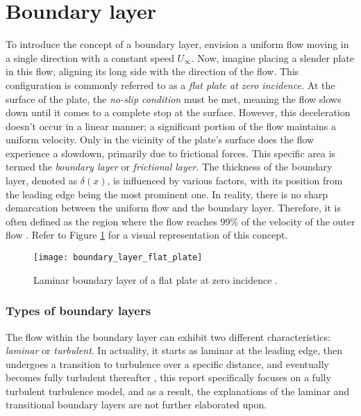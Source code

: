 \section{Boundary layer}
To introduce the concept of a boundary layer, envision a uniform flow moving in
a single direction with a constant speed $U_{\infty}$. Now, imagine placing a
slender plate in this flow, aligning its long side with the direction of the
flow. This configuration is commonly referred to as a \textit{flat plate at
zero incidence.} At the surface of the plate, the \textit{no-slip condition}
must be met, meaning the flow slows down until it comes to a complete stop at
the surface. However, this deceleration doesn't occur in a linear manner; a
significant portion of the flow maintains a uniform velocity. Only in the
vicinity of the plate's surface does the flow experience a slowdown, primarily
due to frictional forces. This specific area is termed the \textit{boundary
layer} or \textit{frictional layer.} The thickness of the boundary layer,
denoted as $\delta(x)$, is influenced by various factors, with its position
from the leading edge being the most prominent one. In reality, there is no
sharp demarcation between the uniform flow and the boundary layer. Therefore,
it is often defined as the region where the flow reaches 99\% of the velocity
of the outer flow \cite{Schlichting2018}. Refer to Figure
\ref{fig:boundary_layer_flat_plate} for a visual representation of this
concept.

\begin{figure}[H] \centering
\texttt{[image: boundary\_layer\_flat\_plate]}
    \caption{Laminar boundary layer of a flat plate at zero incidence
    \cite{Schlichting2018}.}
    \label{fig:boundary_layer_flat_plate}
\end{figure}

\subsubsection{Types of boundary layers}
The flow within the boundary layer can exhibit two different characteristics:
\textit{laminar} or \textit{turbulent}. In actuality, it starts as laminar at
the leading edge, then undergoes a transition to turbulence over a specific
distance, and eventually becomes fully turbulent thereafter
\cite{Schlichting2018}, this report specifically focuses on a fully turbulent
turbulence model, and as a result, the explanations of the laminar and
transitional boundary layers are not further elaborated upon.

